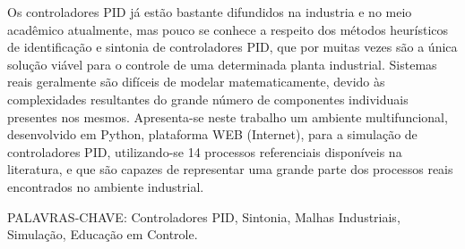 \begin{resumo}

    Os controladores \acs{PID} já estão bastante difundidos na industria e no
    meio acadêmico atualmente, mas pouco se conhece a respeito dos métodos
    heurísticos de identificação e sintonia de controladores \acs{PID},
    que por muitas vezes são a única solução viável para o controle de
    uma determinada planta industrial. Sistemas reais geralmente são difíceis
    de modelar matematicamente, devido às complexidades resultantes do
    grande número de componentes individuais presentes nos mesmos. Apresenta-se
    neste trabalho um ambiente multifuncional, desenvolvido em Python,
    plataforma WEB (Internet), para a simulação de controladores \acs{PID},
    utilizando-se 14 processos referenciais disponíveis na literatura, e
    que são capazes de representar uma grande parte dos processos reais
    encontrados no ambiente industrial.

    PALAVRAS-CHAVE: Controladores PID, Sintonia, Malhas Industriais,
    Simulação, Educação em Controle.

\end{resumo}
